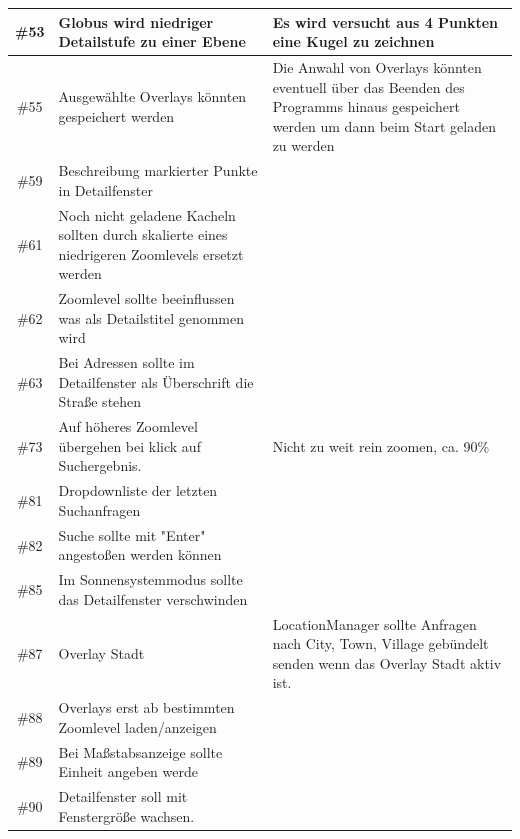 \documentclass[10pt]{scrreprt}
\begin{document}
\begin{longtable}{|c|p{5.2cm}|p{8.2cm}|}
\hline
\#53 & Globus wird niedriger Detailstufe zu einer Ebene & Es wird versucht aus 4 Punkten eine Kugel zu zeichnen \\
\hline
\#55 & Ausgewählte Overlays könnten gespeichert werden & Die Anwahl von Overlays könnten eventuell über das Beenden des Programms hinaus gespeichert werden um dann beim Start geladen zu werden \\
\hline
\#59 & Beschreibung markierter Punkte in Detailfenster \\
\hline
\#61 & Noch nicht geladene Kacheln sollten durch skalierte eines niedrigeren Zoomlevels ersetzt werden \\
\#62 & Zoomlevel sollte beeinflussen was als Detailstitel genommen wird \\
\hline
\#63 & Bei Adressen sollte im Detailfenster als Überschrift die Straße stehen \\
\hline
\#73 & Auf höheres Zoomlevel übergehen bei klick auf Suchergebnis. & Nicht zu weit rein zoomen, ca. 90\% \\
\hline
\#81 & Dropdownliste der letzten Suchanfragen & \\
\hline
\#82 & Suche sollte mit "Enter" angestoßen werden können & \\
\hline
\#85 & Im Sonnensystemmodus sollte das Detailfenster verschwinden & \\
\hline
\#87 & Overlay Stadt & LocationManager sollte Anfragen nach City, Town, Village gebündelt senden wenn das Overlay Stadt aktiv ist. \\
\hline
\#88 & Overlays erst ab bestimmten Zoomlevel laden/anzeigen & \\
\hline
\#89 & Bei Maßstabsanzeige sollte Einheit angeben werde & \\
\hline 
\#90 & Detailfenster soll mit Fenstergröße wachsen. & \\
\hline
\end{longtable}
\end{document}
